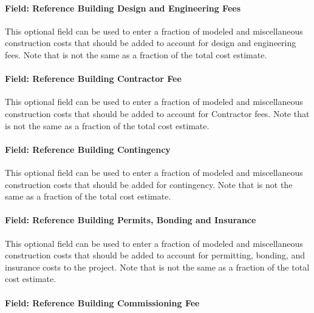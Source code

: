\paragraph{Field: Reference Building Design and Engineering Fees}\label{field-reference-building-design-and-engineering-fees}

This optional field can be used to enter a fraction of modeled and miscellaneous construction costs that should be added to account for design and engineering fees. Note that is not the same as a fraction of the total cost estimate.

\paragraph{Field: Reference Building Contractor Fee}\label{field-reference-building-contractor-fee}

This optional field can be used to enter a fraction of modeled and miscellaneous construction costs that should be added to account for Contractor fees. Note that is not the same as a fraction of the total cost estimate.

\paragraph{Field: Reference Building Contingency}\label{field-reference-building-contingency}

This optional field can be used to enter a fraction of modeled and miscellaneous construction costs that should be added for contingency. Note that is not the same as a fraction of the total cost estimate.

\paragraph{Field: Reference Building Permits, Bonding and Insurance}\label{field-reference-building-permits-bonding-and-insurance}

This optional field can be used to enter a fraction of modeled and miscellaneous construction costs that should be added to account for permitting, bonding, and insurance costs to the project. Note that is not the same as a fraction of the total cost estimate.

\paragraph{Field: Reference Building Commissioning Fee}\label{field-reference-building-commissioning-fee}

